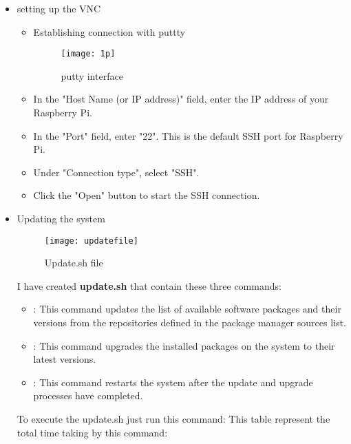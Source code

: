 \begin{itemize}
\item{setting up the VNC}
\begin{itemize}
\item{Establishing connection with puttty}
\FloatBarrier
\begin{figure}[h]

       \centering

        \texttt{[image: 1p]}
   
        \caption{putty interface}
        \label{fig:putty interface}

    \end{figure}

\FloatBarrier
\end{itemize}
\begin{itemize}
\item In the "Host Name (or IP address)" field, enter the IP address of your Raspberry Pi.
\item In the "Port" field, enter "22". This is the default SSH port for Raspberry Pi.
\item Under "Connection type", select "SSH".
\item Click the "Open" button to start the SSH connection.
\end{itemize}
\item{Updating the system}
\FloatBarrier
\begin{figure}[h]

       \centering

        \texttt{[image: updatefile]}
   
        \caption{Update.sh file}
        \label{fig:update.sh}

    \end{figure}

\FloatBarrier
I have created \textbf{update.sh} that contain these three commands:
\begin{itemize}
\item{} : This command updates the list of available software packages and their versions from the repositories defined in the package manager sources list.
\item {}: This command upgrades the installed packages on the system to their latest versions.
\item  {}: This command restarts the system after the update and upgrade processes have completed.
\end{itemize}
To execute the update.sh just run this command:
This table represent the total time taking by this command:\\
\FloatBarrier
\begin{table}[h]


\end{table}
\end{itemize}
